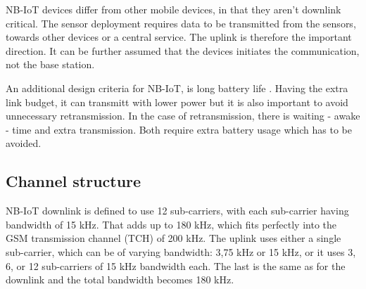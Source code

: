 \documentclass[10pt,a4paper,titlepage,twoside]{article}
\newcommand{\point}[1]{\textbf{\color{ymared} #1}}
\begin{document}
NB-IoT devices differ from other mobile devices, in that they aren't downlink critical. The sensor deployment requires data to be transmitted from the sensors, towards other devices or a central service. The uplink is therefore the important direction. It can be further assumed that the devices initiates the communication, not the base station.

An additional design criteria for NB-IoT, is long battery life \cite{wang}. Having the extra link budget, it can transmitt with lower power but it is also important to avoid unnecessary retransmission. In the case of retransmission, there is waiting - awake - time and extra transmission. Both require extra battery usage which has to be avoided.





\subsection{Channel structure}

NB-IoT downlink is defined to use 12 sub-carriers, with each sub-carrier having bandwidth of 15 kHz. That adds up to 180 kHz, which fits perfectly into the GSM transmission channel (TCH) of 200 kHz. The uplink uses either a single sub-carrier, which can be of varying bandwidth: 3,75 kHz or 15 kHz, or it uses 3, 6, or 12 sub-carriers of 15 kHz bandwidth each\cite{3gpp}. The last is the same as for the downlink and the total bandwidth becomes 180 kHz.
\end{document}
